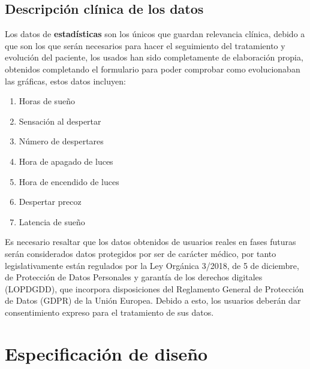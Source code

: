 \documentclass[a4paper,12pt,twoside]{memoir}
\newcommand{\apendice}[1]{
	\chapter{#1}
}
\begin{document}
\section{Descripción clínica de los datos}
Los datos de \textbf{estadísticas} son los únicos que guardan relevancia clínica, debido a que son los que serán necesarios para hacer el seguimiento del tratamiento y evolución del paciente, los usados han sido completamente de elaboración propia, obtenidos completando el formulario para poder comprobar como evolucionaban las gráficas, estos datos incluyen:
\begin{enumerate}
    \item Horas de sueño
    \item Sensación al despertar
    \item Número de despertares
    \item Hora de apagado de luces
    \item Hora de encendido de luces
    \item Despertar precoz
    \item Latencia de sueño
\end{enumerate}

Es necesario resaltar que los datos obtenidos de usuarios reales en fases futuras serán considerados datos protegidos por ser de carácter médico, por tanto legislativamente están regulados por la Ley Orgánica 3/2018, de 5 de diciembre, de Protección de Datos Personales y garantía de los derechos digitales (LOPDGDD), que incorpora disposiciones del Reglamento General de Protección de Datos (GDPR) de la Unión Europea. \cite{boe-2018} Debido a esto, los usuarios deberán dar consentimiento expreso para el tratamiento de sus datos.
\apendice{Especificación de diseño}
\end{document}
